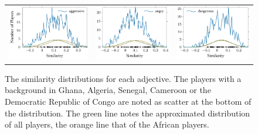 \documentclass[10pt, a4paper]{UUThesisTemplate}
\begin{document}
\begin{figure}
\begin{tabular}{c c c}
\hspace{-2cm}\includegraphics{figures/aggressive_distribution.pdf} & \includegraphics{figures/angry_distribution.pdf} & \includegraphics{figures/dangerous_distribution.pdf}
\end{tabular}
\caption{The similarity distributions for each adjective. The players with a background in Ghana, Algeria, Senegal, Cameroon or the Democratic Republic of Congo are noted as scatter at the bottom of the distribution. The green line notes the approximated distribution of all players, the orange line that of the African players.}\label{fig:simdetail}
\end{figure}
\end{document}
